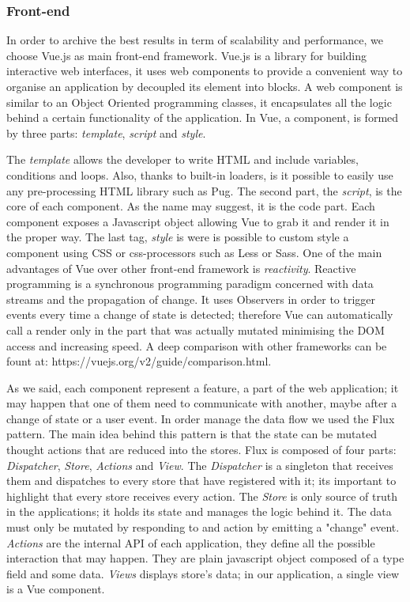 \documentclass[]{usiinfbachelorproject}
\begin{document}
\subsubsection{Front-end}
In order to archive the best results in term of scalability and performance, we choose Vue.js as main front-end framework. Vue.js is a library for building interactive web interfaces, it uses web components to provide a convenient way to organise an application by decoupled its element into blocks.
A web component is similar to an Object Oriented programming classes, it encapsulates all the logic behind a certain functionality of the application. In Vue, a component, is formed by three parts: \emph{template}, \emph{script} and \emph{style}.

The \emph{template} allows the developer to write HTML and include variables, conditions and loops. Also, thanks to built-in loaders, is it possible to easily use any pre-processing HTML library such as Pug. 
The second part, the \emph{script}, is the core of each component. As the name may suggest, it is the code part. Each component exposes a Javascript object allowing Vue to grab it and render it in the proper way.
The last tag, \emph{style} is were is possible to custom style a component using CSS or css-processors such as  Less or Sass.
One of the main advantages of Vue over other front-end framework is \emph{reactivity}. Reactive programming is a synchronous programming paradigm concerned with data streams and the propagation of change. It uses Observers in order to trigger events every time a change of state is detected; therefore Vue can automatically call a render only in the part that was actually mutated minimising the DOM access and increasing speed.
A deep comparison with other frameworks can be fount at: https://vuejs.org/v2/guide/comparison.html.

As we said, each component represent a feature, a part of the web application; it may happen that one of them need to communicate with another, maybe after a change of state or a user event. In order manage the data flow we used the Flux pattern. The main idea behind this pattern is that the state can be mutated thought actions that are reduced into the stores. Flux is composed of four parts: \emph{Dispatcher}, \emph{Store}, \emph{Actions} and \emph{View}.
The \emph{Dispatcher} is a singleton that receives them and dispatches to every store that have registered with it; its important to highlight that every store receives every action.
The \emph{Store} is only source of truth in the applications; it holds its state and manages the logic behind it. The data must only be mutated by responding to and action by emitting a "change" event.
\emph{Actions} are the internal API of each application, they define all the possible interaction that may happen. They are plain javascript object composed of a type field and some data.
\emph{Views} displays store's data; in our application, a single view is a Vue component.
\end{document}
